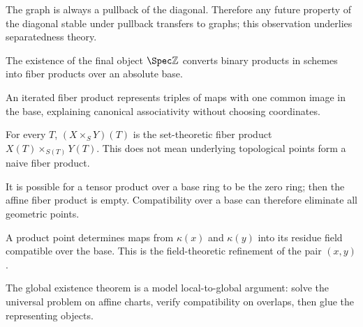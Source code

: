 \begin{example}\label{ex:vi23-a08}
The graph is always a pullback of the diagonal. Therefore any future property of the diagonal stable under pullback transfers to graphs; this observation underlies separatedness theory.
\end{example}

\begin{example}\label{ex:vi23-a09}
The existence of the final object $\Spec\mathbb Z$ converts binary products in schemes into fiber products over an absolute base.
\end{example}

\begin{example}\label{ex:vi23-a10}
An iterated fiber product represents triples of maps with one common image in the base, explaining canonical associativity without choosing coordinates.
\end{example}

\begin{example}\label{ex:vi23-a11}
For every $T$, $(X\times_SY)(T)$ is the set-theoretic fiber product $X(T)\times_{S(T)}Y(T)$. This does not mean underlying topological points form a naive fiber product.
\end{example}

\begin{example}\label{ex:vi23-a12}
It is possible for a tensor product over a base ring to be the zero ring; then the affine fiber product is empty. Compatibility over a base can therefore eliminate all geometric points.
\end{example}

\begin{example}\label{ex:vi23-a13}
A product point determines maps from $\kappa(x)$ and $\kappa(y)$ into its residue field compatible over the base. This is the field-theoretic refinement of the pair $(x,y)$.
\end{example}

\begin{example}\label{ex:vi23-a14}
The global existence theorem is a model local-to-global argument: solve the universal problem on affine charts, verify compatibility on overlaps, then glue the representing objects.
\end{example}
